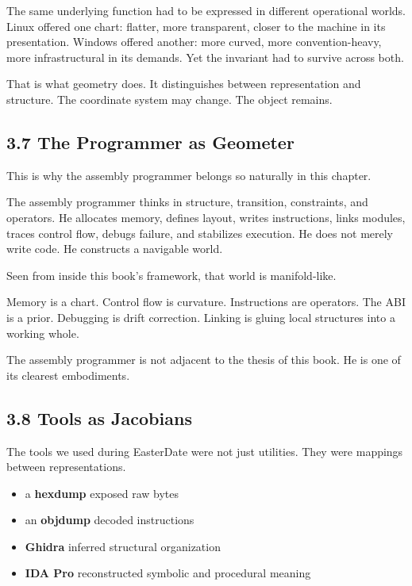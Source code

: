 \documentclass[
]{article}
\providecommand{\tightlist}{%
  \setlength{\itemsep}{0pt}\setlength{\parskip}{0pt}}
\begin{document}
The same underlying function had to be expressed in different
operational worlds. Linux offered one chart: flatter, more transparent,
closer to the machine in its presentation. Windows offered another: more
curved, more convention-heavy, more infrastructural in its demands. Yet
the invariant had to survive across both.

That is what geometry does. It distinguishes between representation and
structure. The coordinate system may change. The object remains.

\hypertarget{the-programmer-as-geometer}{%
\subsection{3.7 The Programmer as
Geometer}\label{the-programmer-as-geometer}}

This is why the assembly programmer belongs so naturally in this
chapter.

The assembly programmer thinks in structure, transition, constraints,
and operators. He allocates memory, defines layout, writes instructions,
links modules, traces control flow, debugs failure, and stabilizes
execution. He does not merely write code. He constructs a navigable
world.

Seen from inside this book's framework, that world is manifold-like.

Memory is a chart. Control flow is curvature. Instructions are
operators. The ABI is a prior. Debugging is drift correction. Linking is
gluing local structures into a working whole.

The assembly programmer is not adjacent to the thesis of this book. He
is one of its clearest embodiments.

\hypertarget{tools-as-jacobians}{%
\subsection{3.8 Tools as Jacobians}\label{tools-as-jacobians}}

The tools we used during EasterDate were not just utilities. They were
mappings between representations.

\begin{itemize}
\tightlist
\item
  a \textbf{hexdump} exposed raw bytes
\item
  an \textbf{objdump} decoded instructions
\item
  \textbf{Ghidra} inferred structural organization
\item
  \textbf{IDA Pro} reconstructed symbolic and procedural meaning
\end{itemize}
\end{document}
